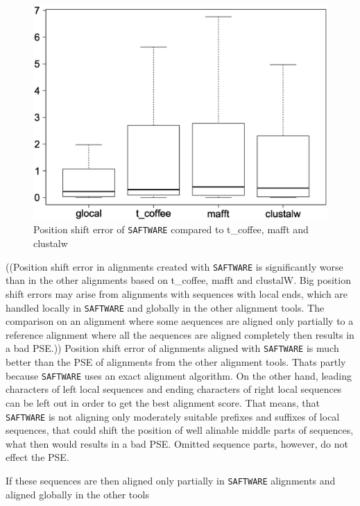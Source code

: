 \documentclass[a4paper,10pt]{article}
\newcommand{\TODO}[1]{\begingroup\color{red}#1\endgroup}
\newcommand{\SAFTWARE}{\TODO{\texttt{SAFTWARE}}}
\begin{document}
{\begin{figure}
  \begin{center}
    \includegraphics[width=1\columnwidth]{pse_compued_correctly.eps}
  \end{center}
  \label{fig:pse}
  \caption{Position shift error of \SAFTWARE{} compared to t\_coffee, mafft and clustalw}
\end{figure}
((Position shift error in alignments created with \SAFTWARE{} is significantly worse than in the other alignments based on t\_coffee, mafft and clustalW. Big position shift errors may arise from alignments with sequences with local ends, which are handled locally in \SAFTWARE{} and globally in the other alignment tools. The comparison on an alignment where some aequences are aligned only partially to a reference alignment where all the aequences are aligned completely then results in a bad PSE.)) Position shift error of alignments aligned with \SAFTWARE{} is much better than the PSE of alignments from the other alignment tools. Thats partly because \SAFTWARE{} uses an exact alignment algorithm. On the other hand, leading characters of left local sequences and ending characters of right local sequences can be left out in order to get the best alignment score. That means, that \SAFTWARE{} is not aligning only moderately suitable prefixes and suffixes of local sequences, that could shift the position of well alinable middle parts of sequences, what then would results in a bad PSE. Omitted sequence parts, however, do not effect the PSE.

If these sequences are then aligned only partially in \SAFTWARE{} alignments and aligned globally in the other tools
}
\end{document}
